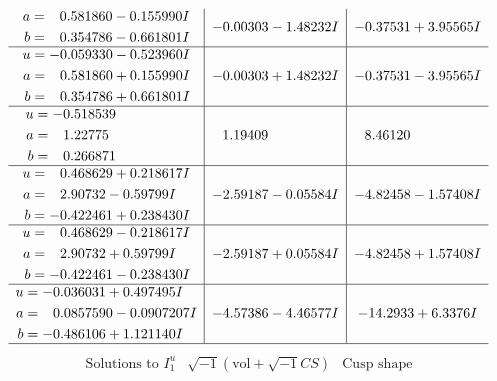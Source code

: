 \documentclass[1p]{elsarticle_modified}
\theoremstyle{definition}
\newcommand{\I}{\sqrt{-1}}
\begin{document}
$$\begin{array}{c|c|c}
\begin{aligned}
a &= \phantom{-}0.581860 - 0.155990 I \\
b &= \phantom{-}0.354786 - 0.661801 I\end{aligned}
 & -0.00303 - 1.48232 I & -0.37531 + 3.95565 I \\ \hline\begin{aligned}
u &= -0.059330 - 0.523960 I \\
a &= \phantom{-}0.581860 + 0.155990 I \\
b &= \phantom{-}0.354786 + 0.661801 I\end{aligned}
 & -0.00303 + 1.48232 I & -0.37531 - 3.95565 I \\ \hline\begin{aligned}
u &= -0.518539\phantom{ +0.000000I} \\
a &= \phantom{-}1.22775\phantom{ +0.000000I} \\
b &= \phantom{-}0.266871\phantom{ +0.000000I}\end{aligned}
 & \phantom{-}1.19409\phantom{ +0.000000I} & \phantom{-}8.46120\phantom{ +0.000000I} \\ \hline\begin{aligned}
u &= \phantom{-}0.468629 + 0.218617 I \\
a &= \phantom{-}2.90732 - 0.59799 I \\
b &= -0.422461 + 0.238430 I\end{aligned}
 & -2.59187 - 0.05584 I & -4.82458 - 1.57408 I \\ \hline\begin{aligned}
u &= \phantom{-}0.468629 - 0.218617 I \\
a &= \phantom{-}2.90732 + 0.59799 I \\
b &= -0.422461 - 0.238430 I\end{aligned}
 & -2.59187 + 0.05584 I & -4.82458 + 1.57408 I \\ \hline\begin{aligned}
u &= -0.036031 + 0.497495 I \\
a &= \phantom{-}0.0857590 - 0.0907207 I \\
b &= -0.486106 + 1.121140 I\end{aligned}
 & -4.57386 - 4.46577 I & -14.2933 + 6.3376 I\\
 \hline 
 \end{array}$$\newpage$$\begin{array}{c|c|c}  
\text{Solutions to }I^u_{1}& \I (\text{vol} + \sqrt{-1}CS) & \text{Cusp shape}\\
 \hline 
\begin{aligned}

\end{aligned}
\end{array}$$
\end{document}
